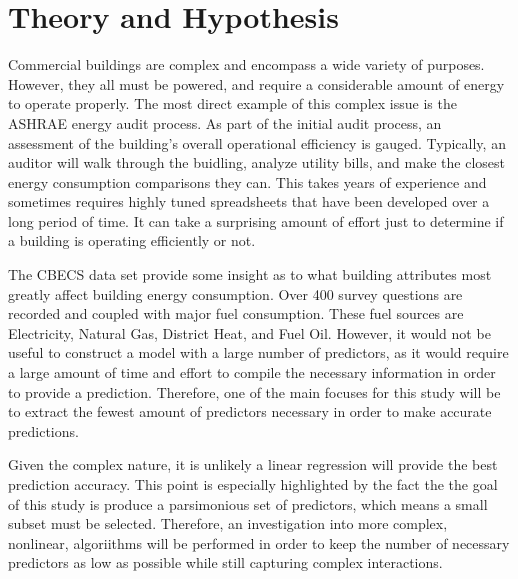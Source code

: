 \section*{Theory and Hypothesis}
\label{sec:theory_and_hypothesis}

Commercial buildings are complex and encompass a wide variety of purposes. However, they all must be powered, and require a considerable amount of energy to operate properly.  The most direct example of this complex issue is the ASHRAE energy audit process.  As part of the initial audit process, an assessment of the building's overall operational efficiency is gauged.  Typically, an auditor will walk through the buidling, analyze utility bills, and make the closest energy consumption comparisons they can.  This takes years of experience and sometimes requires highly tuned spreadsheets that have been developed over a long period of time.  It can take a surprising amount of effort just to determine if a building is operating efficiently or not.

The CBECS data set provide some insight as to what building attributes most greatly affect building energy consumption.  Over 400 survey questions are recorded and coupled with major fuel consumption.  These fuel sources are Electricity, Natural Gas, District Heat, and Fuel Oil.  However, it would not be useful to construct a model with a large number of predictors, as it would require a large amount of time and effort to compile the necessary information in order to provide a prediction.  Therefore, one of the main focuses for this study will be to extract the fewest amount of predictors necessary in order to make accurate predictions.  

Given the complex nature, it is unlikely a linear regression will provide the best prediction accuracy.  This point is especially highlighted by the fact the the goal of this study is produce a parsimonious set of predictors, which means a small subset must be selected.  Therefore, an investigation into more complex, nonlinear, algoriithms will be performed in order to keep the number of necessary predictors as low as possible while still capturing complex interactions.